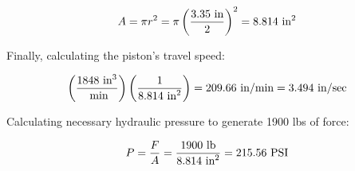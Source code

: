 $$A = \pi r^2 = \pi \left(3.35 \hbox{ in} \over 2 \right)^2 = 8.814 \hbox{ in}^2$$

\vskip 10pt

Finally, calculating the piston's travel speed:

$$\left(1848 \hbox{ in}^3 \over \hbox{ min} \right) \left(1 \over 8.814 \hbox{ in}^2 \right) = 209.66 \hbox{ in/min} = 3.494 \hbox{ in/sec}$$

\vskip 10pt

Calculating necessary hydraulic pressure to generate 1900 lbs of force:

$$P = {F \over A} = {1900 \hbox{ lb} \over 8.814 \hbox{ in}^2} = 215.56 \hbox{ PSI}$$











